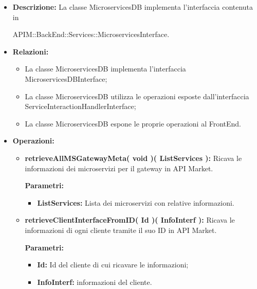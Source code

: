 \begin{itemize}
	\item \textbf{Descrizione:} La classe MicroservicesDB implementa l'interfaccia contenuta in \\
	\begin{minipage} 
		{\linewidth} APIM::BackEnd::Services::MicroservicesInterface.
	\end{minipage}

	\item \textbf{Relazioni:}
		\begin{itemize}
			\item La classe MicroservicesDB implementa l'interfaccia MicroservicesDBInterface;
			\item La classe MicroservicesDB utilizza le operazioni esposte dall'interfaccia ServiceInteractionHandlerInterface;
			\item La classe MicroservicesDB espone le proprie operazioni al FrontEnd.
		\end{itemize}
	\item \textbf{Operazioni:}
		\begin{itemize}
		
			\item \textbf{retrieveAllMSGatewayMeta( void )( ListServices ):} Ricava le informazioni dei microservizi per il gateway in API Market.
			\begin{description}
				\item[\textbf{Parametri:}]
			\end{description}
			\begin{itemize}
				\item \textbf{ListServices:} Lista dei microservizi con relative informazioni.
			\end{itemize}
		
			\item \textbf{retrieveClientInterfaceFromID( Id )( InfoInterf ):} Ricava le informazioni di ogni cliente tramite il suo ID in API Market.
			\begin{description}
				\item[\textbf{Parametri:}]
			\end{description}
			\begin{itemize}
				\item \textbf{Id:} Id del cliente di cui ricavare le informazioni;
				\item \textbf{InfoInterf:} informazioni del cliente.
			\end{itemize}
		

\end{itemize}
\end{itemize}

